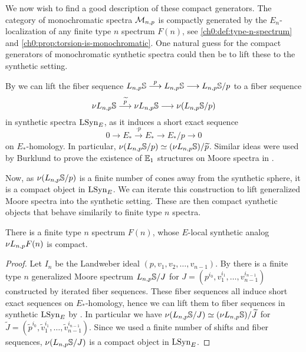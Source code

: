 
We now wish to find a good description of these compact generators. The category of monochromatic spectra $\mathcal{M}_{n,p}$ is compactly generated by the $E_n$-localization of any finite type $n$ spectrum $F(n)$, see \cref{ch0:def:type-n-spectrum} and \cref{ch0:prop:torsion-is-monochromatic}. One natural guess for the compact generators of monochromatic synthetic spectra could then be to lift these to the synthetic setting. 

\begin{construction}
    By \cite[4.23]{pstragowski_2022} we can lift the fiber sequence $L_{n,p}\mathbb{S}\overset{p}{\longrightarrow} L_{n,p}\mathbb{S}\longrightarrow L_{n,p}\mathbb{S}/p$ to a fiber sequence 
    \[\nu L_{n,p}\mathbb{S} \overset{\widetilde{p}}{\longrightarrow} \nu L_{n,p}\mathbb{S}\longrightarrow \nu (L_{n,p}\mathbb{S}/p)\] 
    in synthetic spectra $\mathrm{LSyn}_{E}$, as it induces a short exact sequence 
    \[0\to E_{*} \overset{\cdot p}\to E_{*}\to E_{*}/p\to 0\]
    on $E_{*}$-homology. In particular, $\nu (L_{n,p}\mathbb{S}/p)\simeq (\nu L_{n,p}\mathbb{S})/\widetilde{p}$. Similar ideas were used by Burklund to prove the existence of $\mathbb{E}_1$ structures on Moore spectra in \cite{burklund_2022}. 
    
    Now, as $\nu (L_{n,p}\mathbb{S}/p)$ is a finite number of cones away from the synthetic sphere, it is a compact object in $\mathrm{LSyn}_{E}$. We can iterate this construction to lift generalized Moore spectra into the synthetic setting. These are then compact synthetic objects that behave similarily to finite type $n$ spectra. 
\end{construction}

\begin{lemma}
    There is a finite type $n$ spectrum $F(n)$, whose $E$-local synthetic analog $\nu L_{n,p} F(n)$ is compact. 
\end{lemma}
\begin{proof}
    Let $I_n$ be the Landweber ideal $(p,v_1, v_2, \ldots, v_{n-1})$. By \cite[4.14]{hovey-strickland_99} there is a finite type $n$ generalized Moore spectrum $L_{n,p}\mathbb{S}/J$ for $J=(p^{i_0}, v_1^{i_1}, \ldots, v_{n-1}^{i_{n-1}})$ constructed by iterated fiber sequences. These fiber sequences all induce short exact sequences on $E_{*}$-homology, hence we can lift them to fiber sequences in synthetic $\mathrm{LSyn}_{E}$ by \cite[4.23]{pstragowski_2022}. In particular we have $\nu (L_{n,p}\mathbb{S}/J) \simeq (\nu L_{n,p}\mathbb{S})/\widetilde{J}$ for $\widetilde{J} = (\widetilde{p}^{i_0}, \widetilde{v}_1^{i_1}, \ldots, \widetilde{v}_{n-1}^{i_{n-1}})$. Since we used a finite number of shifts and fiber sequences, $\nu (L_{n,p}\mathbb{S}/J)$ is a compact object in $\mathrm{LSyn}_{E}$. 
\end{proof}

